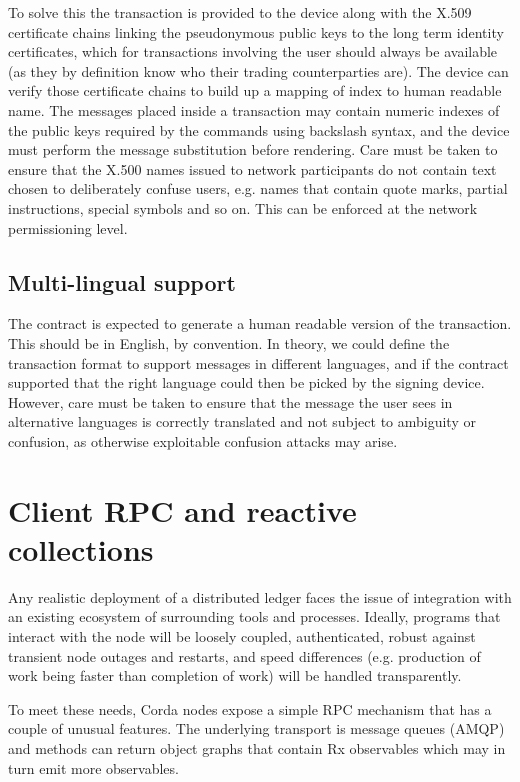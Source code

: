 \documentclass{article}
\begin{document}
To solve this the transaction is provided to the device along with the X.509 certificate chains
linking the pseudonymous public keys to the long term identity certificates, which for transactions involving the user
should always be available (as they by definition know who their trading counterparties are). The device can verify
those certificate chains to build up a mapping of index to human readable name. The messages placed inside a transaction may contain numeric indexes of the public keys required by the
commands using backslash syntax, and the device must perform the message substitution before rendering.
Care must be taken to ensure that the X.500 names issued to network participants do not contain text chosen to
deliberately confuse users, e.g. names that contain quote marks, partial instructions, special symbols and so on.
This can be enforced at the network permissioning level.

\subsection{Multi-lingual support}

The contract is expected to generate a human readable version of the transaction. This should be in English, by
convention. In theory, we could define the transaction format to support messages in different languages, and if
the contract supported that the right language could then be picked by the signing device. However, care must be taken
to ensure that the message the user sees in alternative languages is correctly translated and not subject to ambiguity
or confusion, as otherwise exploitable confusion attacks may arise.

\section{Client RPC and reactive collections}

Any realistic deployment of a distributed ledger faces the issue of integration with an existing ecosystem of
surrounding tools and processes. Ideally, programs that interact with the node will be loosely coupled,
authenticated, robust against transient node outages and restarts, and speed differences (e.g. production of
work being faster than completion of work) will be handled transparently.

To meet these needs, Corda nodes expose a simple RPC mechanism that has a couple of unusual features. The underlying
transport is message queues (AMQP) and methods can return object graphs that contain Rx observables\cite{Rx} which may
in turn emit more observables.
\end{document}
